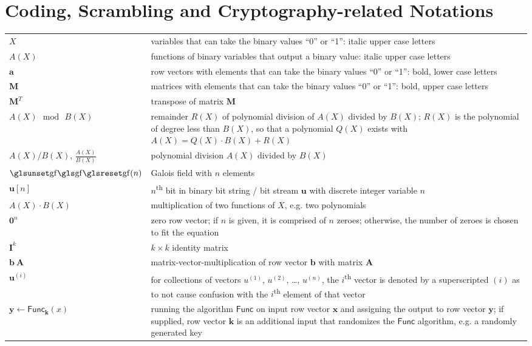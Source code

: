 \section*{Coding, Scrambling and Cryptography-related Notations}
\setlength\extrarowheight{0.5em}
\begin{flushleft}
\begin{longtable}{>{\raggedright}p{} >{\raggedright}p{}}
$X$ & variables that can take the binary values ``0'' or ``1'': italic upper case letters \tabularnewline
$A(X)$ & functions of binary variables that output a binary value: italic upper case letters \tabularnewline
$\mathbf a$ & row vectors with elements that can take the binary values ``0'' or ``1'': bold, lower case letters \tabularnewline
$\mathbf M$ & matrices with elements that can take the binary values ``0'' or ``1'': bold, upper case letters \tabularnewline
$\mathbf M^T$ & transpose of matrix $\mathbf M$\tabularnewline
$A(X) \, \bmod \, B(X)$ & remainder $R(X)$ of polynomial division of $A(X)$ divided by $B(X)$; $R(X)$ is the polynomial of degree less than $B(X)$, so that a polynomial $Q(X)$ exists with $A(X) = Q(X) \cdot B(X) + R(X)$ \tabularnewline
$A(X) / B(X)$, $\frac{A(X)}{B(X)}$ & polynomial division $A(X)$ divided by $B(X)$ \tabularnewline
$\GF(n)$ & Galois field with $n$ elements \tabularnewline
$\mathbf u\left[n\right]$  & $n$\textsuperscript{th} bit in binary bit string / bit stream $\mathbf u$ with discrete integer variable $n$ \tabularnewline
$A(X) \cdot B(X)$ & multiplication of two functions of $X$, e.g. two polynomials \tabularnewline
$\mathbf 0^n$ & zero row vector; if $n$ is given, it is comprised of $n$ zeroes; otherwise, the number of zeroes is chosen to fit the equation \tabularnewline
$\mathbf I^k$ & $k \times k$ identity matrix \tabularnewline
$\mathbf b ~ \mathbf A$ & matrix-vector-multiplication of row vector $\mathbf b$ with matrix $\mathbf A$ \tabularnewline
$\mathbf u^{(i)}$ & for collections of vectors $u^{(1)}$, $u^{(2)}$, \ldots, $u^{(n)}$, the $i$\textsuperscript{th} vector is denoted by a superscripted $(i)$ as to not cause confusion with the $i$\textsuperscript{th} element of that vector \tabularnewline
$\mathbf y \leftarrow \mathrm{\textsf{Func}}_{\mathbf k}(x)$ & running the algorithm $\mathrm{\textsf{Func}}$ on input row vector $\mathbf x$ and assigning the output to row vector $\mathbf y$; if supplied, row vector $\mathbf k$ is an additional input that randomizes the $\mathrm{\textsf{Func}}$ algorithm, e.g. a randomly generated key \tabularnewline
\end{longtable}
\end{flushleft}
\setlength\extrarowheight{0em}

